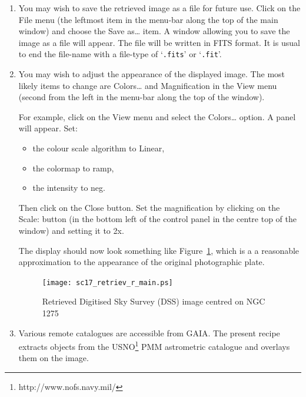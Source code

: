 \documentclass[twoside,11pt]{article}
\newcommand{\htmladdnormallinkfoot}[2]{#1\footnote{#2}}
\begin{document}
\begin{enumerate}
  \item You may wish to save the retrieved image as a file for future
   use.  Click on the {\sf File} menu (the leftmost item in the menu-bar
   along the top of the main window) and choose the {\sf Save as\ldots}
   item.  A window allowing you to save the image as a file will appear.
   The file will be written in FITS format.  It is usual to end the
   file-name with a file-type of `{\tt .fits}' or `{\tt .fit}'.

  \item You may wish to adjust the appearance of the displayed image.
   The most likely items to change are {\sf Colors\ldots} and {\sf
   Magnification} in the {\sf View} menu (second from the left in the
   menu-bar along the top of the window).

   For example, click on the {\sf View} menu and select the {\sf
   Colors\ldots} option.  A panel will appear.  Set:

  \begin{itemize}

    \item the colour scale algorithm to {\sf Linear},

    \item the colormap to {\sf ramp},

    \item the intensity to {\sf neg}.

  \end{itemize}

   Then click on the {\sf Close} button.
   Set the magnification by clicking on the {\sf Scale:} button (in the
   bottom left of the control panel in the centre top of the window) and
   setting it to {\sf 2x}.

   The display should now look something like Figure~\ref{RETRIEV_R_MAIN},
   which is a a reasonable approximation to the appearance of the
   original photographic plate.

  \begin{figure}[htbp]
     \centering
     \texttt{[image: sc17\_retriev\_r\_main.ps]}
     \begin{quote}
     \caption[Retrieved DSS image centred on NGC 1275]
     {Retrieved Digitised Sky Survey (DSS) image centred on NGC 1275
     \label{RETRIEV_R_MAIN} }
     \end{quote}
  \end{figure}

  \item Various remote catalogues are accessible from GAIA.  The present
   recipe extracts objects from the
   \htmladdnormallinkfoot{USNO}{http://www.nofs.navy.mil/} PMM astrometric
   catalogue\cite{PMM} and overlays them on the image.


\end{enumerate}
\end{document}
